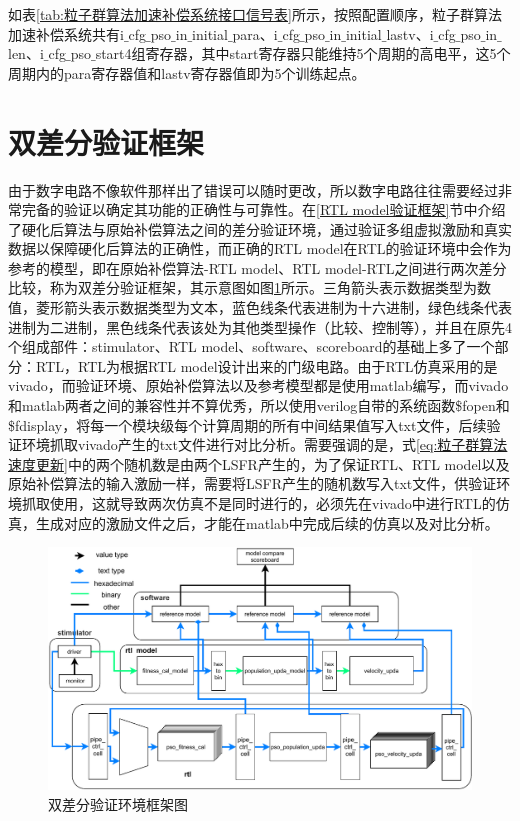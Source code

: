 如表\ref{tab:粒子群算法加速补偿系统接口信号表}所示，按照配置顺序，粒子群算法加速补偿系统共有i$\_$cfg$\_$pso$\_$in$\_$initial$\_$para、i$\_$cfg$\_$pso$\_$in$\_$initial$\_$lastv、i$\_$cfg$\_$pso$\_$in$\_$len、i$\_$cfg$\_$pso$\_$start4组寄存器，其中start寄存器只能维持5个周期的高电平，这5个周期内的para寄存器值和lastv寄存器值即为5个训练起点。

\section{双差分验证框架}
由于数字电路不像软件那样出了错误可以随时更改，所以数字电路往往需要经过非常完备的验证以确定其功能的正确性与可靠性。在\ref{RTL model验证框架}节中介绍了硬化后算法与原始补偿算法之间的差分验证环境，通过验证多组虚拟激励和真实数据以保障硬化后算法的正确性，而正确的RTL model在RTL的验证环境中会作为参考的模型，即在原始补偿算法-RTL model、RTL model-RTL之间进行两次差分比较，称为双差分验证框架，其示意图如图\ref{fig:双差分验证环境框架图}所示。三角箭头表示数据类型为数值，菱形箭头表示数据类型为文本，蓝色线条代表进制为十六进制，绿色线条代表进制为二进制，黑色线条代表该处为其他类型操作（比较、控制等），并且在原先4个组成部件：stimulator、RTL model、software、scoreboard的基础上多了一个部分：RTL，RTL为根据RTL model设计出来的门级电路。由于RTL仿真采用的是vivado，而验证环境、原始补偿算法以及参考模型都是使用matlab编写，而vivado和matlab两者之间的兼容性并不算优秀，所以使用verilog自带的系统函数\$fopen和\$fdisplay，将每一个模块级每个计算周期的所有中间结果值写入txt文件，后续验证环境抓取vivado产生的txt文件进行对比分析。需要强调的是，式\eqref{eq:粒子群算法速度更新}中的两个随机数是由两个LSFR产生的，为了保证RTL、RTL model以及原始补偿算法的输入激励一样，需要将LSFR产生的随机数写入txt文件，供验证环境抓取使用，这就导致两次仿真不是同时进行的，必须先在vivado中进行RTL的仿真，生成对应的激励文件之后，才能在matlab中完成后续的仿真以及对比分析。
\begin{figure}[htb]
    \centering
    \includegraphics[width=14cm]{fig/5-fig/双差分验证环境.drawio.pdf}
    \caption{双差分验证环境框架图}
    \label{fig:双差分验证环境框架图}
\end{figure}

